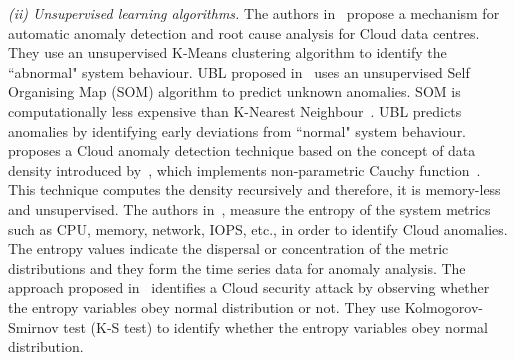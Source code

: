 \textit{(ii) Unsupervised learning algorithms.}
The authors in~\cite{automated-detection:2016} propose a mechanism for automatic anomaly detection and root cause analysis for Cloud data centres. They use an unsupervised K-Means clustering algorithm to identify the ``abnormal" system behaviour. 
UBL proposed in~\cite{UBL:2012} uses an unsupervised Self Organising Map (SOM) algorithm to predict unknown anomalies. SOM is computationally less expensive than K-Nearest Neighbour~\cite{knearest:2005}. 
UBL predicts anomalies by identifying early deviations from ``normal" system behaviour. 
\cite{density-based:2016} proposes a Cloud anomaly detection technique based on the concept of data density introduced by~\cite{density-based_ref1:2011}, which implements non-parametric Cauchy function~\cite{density-based_ref2:2010}. 
This technique computes the density recursively and therefore, it is memory-less and unsupervised.  
The authors in~\cite{EbAT:2010}, \cite{entorpy_based_detection_2:2014} measure the entropy of the system metrics such as CPU, memory, network, IOPS, etc., in order to identify Cloud anomalies. The entropy values indicate the dispersal or concentration of the metric distributions and they form the time series data for anomaly analysis.
The approach proposed in~\cite{entorpy_based_detection_2:2014} identifies a Cloud security attack by observing whether the entropy variables obey normal distribution or not. They use Kolmogorov-Smirnov test (K-S test) to identify whether the entropy variables obey normal distribution. 
